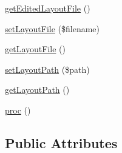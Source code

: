 \begin{DoxyCompactItemize}
\hyperlink{classModuleObject_a14fc83257a1518a1753c50cb11289c27}{get\+Edited\+Layout\+File} ()
\item 
\hyperlink{classModuleObject_aab99465b1bac81df148c829a3b14f933}{set\+Layout\+File} (\$filename)
\item 
\hyperlink{classModuleObject_af446ac0f9c2a19c2629f30afd6271ec6}{get\+Layout\+File} ()
\item 
\hyperlink{classModuleObject_a15410a43eadf4aa49e4fed4b26cd1f25}{set\+Layout\+Path} (\$path)
\item 
\hyperlink{classModuleObject_aab8f7fe782fee9313b1a84f5a3afd2dd}{get\+Layout\+Path} ()
\item 
\hyperlink{classModuleObject_a621ea29505c6ccd4444a06bc1c8554a5}{proc} ()
\end{DoxyCompactItemize}
\subsection*{Public Attributes}
